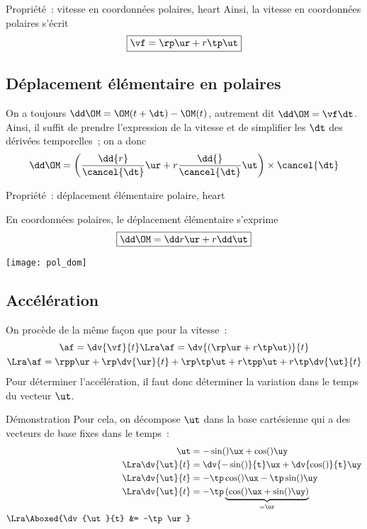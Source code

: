 \documentclass[../main/main.tex]{subfiles}
\begin{document}
\begin{tprop}{Propriété~: vitesse en coordonnées polaires, heart}
    Ainsi, la vitesse en coordonnées polaires s'écrit
    \[\boxed{\vf = \rp\ur + r\tp\ut}\]
\end{tprop}

\subsection{Déplacement élémentaire en polaires}
On a toujours $\dd\OM = \OM(t+\dt) - \OM(t)$, autrement dit $\dd\OM = \vf\dt$.
Ainsi, il suffit de prendre l'expression de la vitesse et de simplifier les
$\dt$ des dérivées temporelles~; on a donc
\begin{gather*}
    \dd\OM = \left(\frac{\dd{r}}{\cancel{\dt}}\ur + r
    \frac{\dd{\tt}}{\cancel{\dt}}\ut\right)\times\cancel{\dt}
\end{gather*}

\begin{tprop}{Propriété~: déplacement élémentaire polaire, heart}
    \begin{minipage}{0.70\linewidth}
    En coordonnées polaires, le déplacement élémentaire s'exprime
    \[\boxed{\dd\OM = \dd r\ur + r\dd\tt\ut}\]
    \end{minipage}
    \hfill
    \begin{minipage}{0.25\linewidth}
        \begin{center}
            \texttt{[image: pol\_dom]}
        \end{center}
    \end{minipage}
\end{tprop}

\subsection{Accélération}
On procède de la même façon que pour la vitesse~:
\begin{gather*}
    \af = \dv{\vf}{t}
    \Lra 
    \af = \dv{\left(\rp\ur + r\tp\ut\right)}{t}
    \\\Lra
    \af = \rpp\ur + \rp \dv{\ur}{t} + \rp\tp\ut + r\tpp\ut + r\tp \dv{\ut}{t}
\end{gather*}
Pour déterminer l'accélération, il faut donc déterminer la variation dans le
temps du vecteur $\ut$.

\begin{rdemo}{Démonstration}
    Pour cela, on décompose $\ut$ dans la base cartésienne qui a des
    vecteurs de base fixes dans le temps~:
    \begin{align*}
        \ut &= -\sin(\tt)\ux + \cos(\tt)\uy
        \\\Lra
        \dv{\ut}{t} &= \dv{-\sin(\tt)}{t}\ux + \dv{\cos(\tt)}{t}\uy
        \\\Lra
        \dv{\ut}{t} &= -\tp\cos(\tt)\ux - \tp\sin(\tt)\uy
        \\\Lra
        \dv{\ut}{t} &= -\tp
            \underbrace{\left(\cos(\tt)\ux + \sin(\tt)\uy\right)}_{= \ur}
        \\\Lra
        \Aboxed{\dv{\ut}{t} &= -\tp\ur}
    \end{align*}
\end{rdemo}
\end{document}
